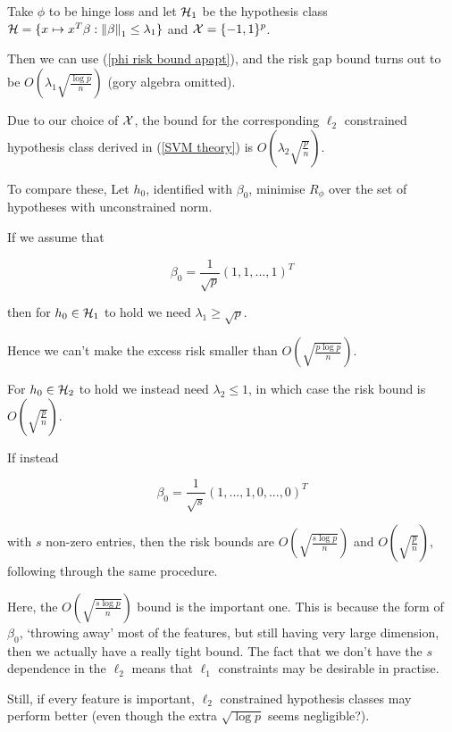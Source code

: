 \documentclass[11pt]{scrartcl}
\begin{document}
\begin{example}
Take $\phi$ to be hinge loss and let $\mathcal{H}_1$ be the hypothesis class $\mathcal{H} = \{ x \mapsto x^T \beta : \left\lVert\beta\right\rVert_1 \le \lambda_1 \}$ and $\mathcal{X} = \{ -1, 1 \}^p$.

Then we can use (\ref{phi risk bound apapt}), and the risk gap bound turns out to be $O\left( \lambda_1 \sqrt{\frac{\log p}{n}} \right)$ (gory algebra omitted).

Due to our choice of $\mathcal{X}$, the bound for the corresponding $\ell_2$ constrained hypothesis class derived in (\ref{SVM theory}) is $O\left( \lambda_2 \sqrt{\frac{p}{n}} \right)$.

To compare these, Let $h_0$, identified with $\beta_0$, minimise $R_\phi$ over the set of hypotheses with unconstrained norm.

\begin{example}
If we assume that 

\begin{equation}
\beta_0 = \frac{1}{\sqrt{p}} (1,1,...,1)^T
\end{equation}

then for $h_0 \in \mathcal{H}_1$ to hold we need $\lambda_1 \ge \sqrt{p}$.

Hence we can't make the excess risk smaller than $O\left(\sqrt{\frac{p \log p}{n}} \right)$. %

For $h_0 \in \mathcal{H}_2$ to hold we instead need $\lambda_2 \le 1$, in which case the risk bound is $O\left( \sqrt{\frac{p}{n}} \right)$.
\end{example}

\begin{example}
If instead

\begin{equation}
\beta_0 = \frac{1}{\sqrt{s}} (1,...,1,0,...,0)^T
\end{equation}

with $s$ non-zero entries, then the risk bounds are $O\left( \sqrt{\frac{s \log p}{n}} \right)$ and $O\left( \sqrt{\frac{p}{n}} \right)$, following through the same procedure.

Here, the $O\left( \sqrt{\frac{s \log p}{n}} \right)$ bound is the important one. This is because the form of $\beta_0$, `throwing away' most of the features, but still having very large dimension, then we actually have a really tight bound. The fact that we don't have the $s$ dependence in the $\ell_2$ means that $\ell_1$ constraints may be desirable in practise.

Still, if every feature is important, $\ell_2$ constrained hypothesis classes may perform better (even though the extra $\sqrt{\log p}$ seems negligible?).
\end{example}
\end{example}
\end{document}
